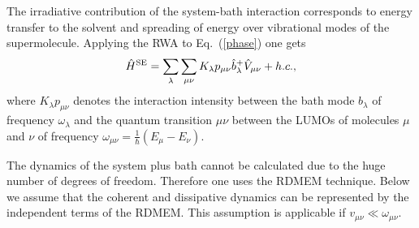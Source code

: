\documentclass[12pt,twoside,a4paper]{report}
\begin{document}
The irradiative contribution of the system-bath interaction
corresponds to  energy transfer to the solvent and spreading of energy
over vibrational modes of the supermolecule. 
Applying the RWA to Eq.~(\ref{phase})
one gets
\begin{eqnarray}
  \label{5-funf} 
\hat H^{\rm SE}
      =   \sum_\lambda 
          \sum_{\mu{}\nu} 
              K_{\lambda} p_{\mu{}\nu} 
              \hat b^+_\lambda \hat V_{\mu{}\nu}
            + h.c., 
\end{eqnarray}
where $K_{\lambda}p_{\mu{}\nu}$ denotes the interaction intensity
between the bath mode $b_{\lambda}$ of frequency $\omega_{\lambda}$
and the quantum transition $\mu{}\nu$ between the LUMOs  of
molecules $\mu{}$ and $\nu$ of frequency 
$\omega_{\mu{} \nu }
       =  \frac{1}
               {\hbar}
          \left( 
             E_{\mu}-E_{\nu} 
          \right)$.


The dynamics of the system plus bath cannot be calculated due to the huge
number of degrees of freedom. Therefore one uses the RDMEM technique.
Below we assume that the coherent and dissipative dynamics can be represented 
by the independent terms of the RDMEM. 
This assumption is applicable if 
$v_{\mu \nu} \ll \omega_{\mu \nu}$.


\end{document}
